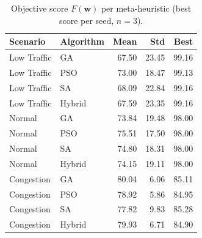 
\begin{table}[H]
\centering
\caption{Objective score $F(\mathbf{w})$ per meta-heuristic (best score per seed, $n=3$).}
\label{tab:scores}
\begin{tabular}{llrrr}
\toprule
\textbf{Scenario} & \textbf{Algorithm} & \textbf{Mean} & \textbf{Std} & \textbf{Best} \\
\midrule
Low Traffic  & GA              & 67.50 & 23.45 & 99.16 \\
Low Traffic  & PSO             & 73.00 & 18.47 & 99.13 \\
Low Traffic  & SA              & 68.09 & 22.84 & 99.16 \\
Low Traffic  & Hybrid          & 67.59 & 23.35 & 99.16 \\
\midrule
Normal       & GA              & 73.84 & 19.48 & 98.00 \\
Normal       & PSO             & 75.51 & 17.50 & 98.00 \\
Normal       & SA              & 74.80 & 18.31 & 98.00 \\
Normal       & Hybrid          & 74.15 & 19.11 & 98.00 \\
\midrule
Congestion   & GA              & 80.04 & 6.06  & 85.11 \\
Congestion   & PSO             & 78.92 & 5.86  & 84.95 \\
Congestion   & SA              & 77.82 & 9.83  & 85.28 \\
Congestion   & Hybrid          & 79.93 & 6.71  & 84.90 \\
\bottomrule
\end{tabular}
\end{table}


